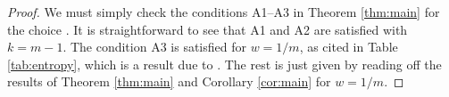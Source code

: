\documentclass{article}
\begin{document}
\begin{proof}
We must simply check the conditions A1--A3 in Theorem \ref{thm:main} for the
choice . It is straightforward to
see that A1 and A2 are satisfied with $k=m-1$. The condition A3 is satisfied for
$w=1/m$, as cited in Table \ref{tab:entropy}, which is a result due to
\citet{birman1967piecewise}. The rest is just given by reading off the results
of Theorem \ref{thm:main} and Corollary \ref{cor:main} for $w=1/m$.  
\end{proof}



\end{document}
